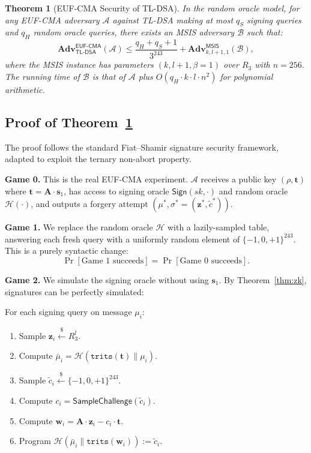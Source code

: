 \documentclass[11pt,a4paper]{article}
\newtheorem{theorem}{Theorem}[section]
\theoremstyle{definition}
\newcommand{\Adv}{\mathbf{Adv}}
\newcommand{\Sign}{\textsf{Sign}}
\newcommand{\MSIS}{\textsf{MSIS}}
\newcommand{\EUFCMA}{\textsf{EUF-CMA}}
\begin{document}
\begin{theorem}[EUF-CMA Security of TL-DSA]
\label{thm:main}
In the random oracle model, for any EUF-CMA adversary $\mathcal{A}$ against TL-DSA making at most $q_S$ signing queries and $q_H$ random oracle queries, there exists an MSIS adversary $\mathcal{B}$ such that:
\[
  \Adv^{\EUFCMA}_{\textsf{TL-DSA}}(\mathcal{A}) \leq \frac{q_H + q_S + 1}{3^{243}} + \Adv^{\MSIS}_{k, l+1, 1}(\mathcal{B}),
\]
where the MSIS instance has parameters $(k, l+1, \beta=1)$ over $R_3$ with $n = 256$.
The running time of $\mathcal{B}$ is that of $\mathcal{A}$ plus $O(q_H \cdot k \cdot l \cdot n^2)$ for polynomial arithmetic.
\end{theorem}

\subsection{Proof of Theorem~\ref{thm:main}}

The proof follows the standard Fiat--Shamir signature security framework, adapted to exploit the ternary non-abort property.

\medskip
\noindent\textbf{Game 0.} This is the real EUF-CMA experiment. $\mathcal{A}$ receives a public key $(\rho, \mathbf{t})$ where $\mathbf{t} = \mathbf{A} \cdot \mathbf{s}_1$, has access to signing oracle $\Sign(\textit{sk}, \cdot)$ and random oracle $\mathcal{H}(\cdot)$, and outputs a forgery attempt $(\mu^*, \sigma^* = (\mathbf{z}^*, \tilde{c}^*))$.

\medskip
\noindent\textbf{Game 1.} We replace the random oracle $\mathcal{H}$ with a lazily-sampled table, answering each fresh query with a uniformly random element of $\{-1,0,+1\}^{243}$. This is a purely syntactic change:
\[
  \Pr[\text{Game 1 succeeds}] = \Pr[\text{Game 0 succeeds}].
\]

\medskip
\noindent\textbf{Game 2.} We simulate the signing oracle without using $\mathbf{s}_1$. By Theorem~\ref{thm:zk}, signatures can be perfectly simulated:

For each signing query on message $\mu_i$:
\begin{enumerate}[leftmargin=2em]
\item Sample $\mathbf{z}_i \xleftarrow{\$} R_3^l$.
\item Compute $\bar{\mu}_i = \mathcal{H}(\texttt{trits}(\mathbf{t}) \| \mu_i)$.
\item Sample $\tilde{c}_i \xleftarrow{\$} \{-1,0,+1\}^{243}$.
\item Compute $c_i = \textsf{SampleChallenge}(\tilde{c}_i)$.
\item Compute $\mathbf{w}_i = \mathbf{A} \cdot \mathbf{z}_i - c_i \cdot \mathbf{t}$.
\item Program $\mathcal{H}(\bar{\mu}_i \| \texttt{trits}(\mathbf{w}_i)) := \tilde{c}_i$.
\end{enumerate}
\end{document}
